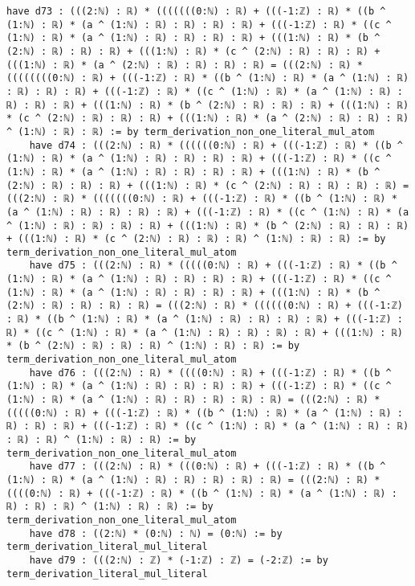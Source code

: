\documentclass{article}
\begin{document}
\begin{tcolorbox}[colback=white!10, width=\linewidth]
\begin{lstlisting}[language=Lean4]
    have d73 : (((2:ℕ) : ℝ) * (((((((0:ℕ) : ℝ) + (((-1:ℤ) : ℝ) * ((b ^ (1:ℕ) : ℝ) * (a ^ (1:ℕ) : ℝ) : ℝ) : ℝ) : ℝ) + (((-1:ℤ) : ℝ) * ((c ^ (1:ℕ) : ℝ) * (a ^ (1:ℕ) : ℝ) : ℝ) : ℝ) : ℝ) + (((1:ℕ) : ℝ) * (b ^ (2:ℕ) : ℝ) : ℝ) : ℝ) + (((1:ℕ) : ℝ) * (c ^ (2:ℕ) : ℝ) : ℝ) : ℝ) + (((1:ℕ) : ℝ) * (a ^ (2:ℕ) : ℝ) : ℝ) : ℝ) : ℝ) = (((2:ℕ) : ℝ) * ((((((((0:ℕ) : ℝ) + (((-1:ℤ) : ℝ) * ((b ^ (1:ℕ) : ℝ) * (a ^ (1:ℕ) : ℝ) : ℝ) : ℝ) : ℝ) + (((-1:ℤ) : ℝ) * ((c ^ (1:ℕ) : ℝ) * (a ^ (1:ℕ) : ℝ) : ℝ) : ℝ) : ℝ) + (((1:ℕ) : ℝ) * (b ^ (2:ℕ) : ℝ) : ℝ) : ℝ) + (((1:ℕ) : ℝ) * (c ^ (2:ℕ) : ℝ) : ℝ) : ℝ) + (((1:ℕ) : ℝ) * (a ^ (2:ℕ) : ℝ) : ℝ) : ℝ) ^ (1:ℕ) : ℝ) : ℝ) := by term_derivation_non_one_literal_mul_atom
    have d74 : (((2:ℕ) : ℝ) * ((((((0:ℕ) : ℝ) + (((-1:ℤ) : ℝ) * ((b ^ (1:ℕ) : ℝ) * (a ^ (1:ℕ) : ℝ) : ℝ) : ℝ) : ℝ) + (((-1:ℤ) : ℝ) * ((c ^ (1:ℕ) : ℝ) * (a ^ (1:ℕ) : ℝ) : ℝ) : ℝ) : ℝ) + (((1:ℕ) : ℝ) * (b ^ (2:ℕ) : ℝ) : ℝ) : ℝ) + (((1:ℕ) : ℝ) * (c ^ (2:ℕ) : ℝ) : ℝ) : ℝ) : ℝ) = (((2:ℕ) : ℝ) * (((((((0:ℕ) : ℝ) + (((-1:ℤ) : ℝ) * ((b ^ (1:ℕ) : ℝ) * (a ^ (1:ℕ) : ℝ) : ℝ) : ℝ) : ℝ) + (((-1:ℤ) : ℝ) * ((c ^ (1:ℕ) : ℝ) * (a ^ (1:ℕ) : ℝ) : ℝ) : ℝ) : ℝ) + (((1:ℕ) : ℝ) * (b ^ (2:ℕ) : ℝ) : ℝ) : ℝ) + (((1:ℕ) : ℝ) * (c ^ (2:ℕ) : ℝ) : ℝ) : ℝ) ^ (1:ℕ) : ℝ) : ℝ) := by term_derivation_non_one_literal_mul_atom
    have d75 : (((2:ℕ) : ℝ) * (((((0:ℕ) : ℝ) + (((-1:ℤ) : ℝ) * ((b ^ (1:ℕ) : ℝ) * (a ^ (1:ℕ) : ℝ) : ℝ) : ℝ) : ℝ) + (((-1:ℤ) : ℝ) * ((c ^ (1:ℕ) : ℝ) * (a ^ (1:ℕ) : ℝ) : ℝ) : ℝ) : ℝ) + (((1:ℕ) : ℝ) * (b ^ (2:ℕ) : ℝ) : ℝ) : ℝ) : ℝ) = (((2:ℕ) : ℝ) * ((((((0:ℕ) : ℝ) + (((-1:ℤ) : ℝ) * ((b ^ (1:ℕ) : ℝ) * (a ^ (1:ℕ) : ℝ) : ℝ) : ℝ) : ℝ) + (((-1:ℤ) : ℝ) * ((c ^ (1:ℕ) : ℝ) * (a ^ (1:ℕ) : ℝ) : ℝ) : ℝ) : ℝ) + (((1:ℕ) : ℝ) * (b ^ (2:ℕ) : ℝ) : ℝ) : ℝ) ^ (1:ℕ) : ℝ) : ℝ) := by term_derivation_non_one_literal_mul_atom
    have d76 : (((2:ℕ) : ℝ) * ((((0:ℕ) : ℝ) + (((-1:ℤ) : ℝ) * ((b ^ (1:ℕ) : ℝ) * (a ^ (1:ℕ) : ℝ) : ℝ) : ℝ) : ℝ) + (((-1:ℤ) : ℝ) * ((c ^ (1:ℕ) : ℝ) * (a ^ (1:ℕ) : ℝ) : ℝ) : ℝ) : ℝ) : ℝ) = (((2:ℕ) : ℝ) * (((((0:ℕ) : ℝ) + (((-1:ℤ) : ℝ) * ((b ^ (1:ℕ) : ℝ) * (a ^ (1:ℕ) : ℝ) : ℝ) : ℝ) : ℝ) + (((-1:ℤ) : ℝ) * ((c ^ (1:ℕ) : ℝ) * (a ^ (1:ℕ) : ℝ) : ℝ) : ℝ) : ℝ) ^ (1:ℕ) : ℝ) : ℝ) := by term_derivation_non_one_literal_mul_atom
    have d77 : (((2:ℕ) : ℝ) * (((0:ℕ) : ℝ) + (((-1:ℤ) : ℝ) * ((b ^ (1:ℕ) : ℝ) * (a ^ (1:ℕ) : ℝ) : ℝ) : ℝ) : ℝ) : ℝ) = (((2:ℕ) : ℝ) * ((((0:ℕ) : ℝ) + (((-1:ℤ) : ℝ) * ((b ^ (1:ℕ) : ℝ) * (a ^ (1:ℕ) : ℝ) : ℝ) : ℝ) : ℝ) ^ (1:ℕ) : ℝ) : ℝ) := by term_derivation_non_one_literal_mul_atom
    have d78 : ((2:ℕ) * (0:ℕ) : ℕ) = (0:ℕ) := by term_derivation_literal_mul_literal
    have d79 : (((2:ℕ) : ℤ) * (-1:ℤ) : ℤ) = (-2:ℤ) := by term_derivation_literal_mul_literal

\end{lstlisting}
\end{tcolorbox}
\end{document}
